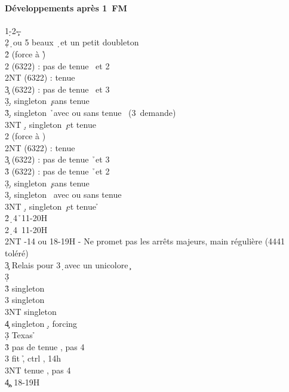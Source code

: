\documentclass[a4paper]{article}
\begin{document}
\paragraph{Développements après 1\pdfc\ FM}

\begin{bidtable}
1\d-2\c--\\
2\d {}\d\ ou 5 beaux \d\ et un petit doubleton\+\\
2\h \> (force à \h )\+\\
2\s {} (6322) : pas de tenue \s\ et 2\c \\
2NT  (6322) : tenue \s \\
3\c {} (6322) : pas de tenue \s\ et 3\c \\
3\d {}\d , singleton \c\ sans tenue \s \\
3\h {}\d , singleton \h\ avec ou sans tenue \s\ (3\s\ demande)\\
3NT \d , singleton \c\ et tenue \s \-\\
2\s \> (force à \s )\+\\
2NT  (6322) : tenue \h \\
3\c {} (6322) : pas de tenue \h\ et 3\c \\
3\h {} (6322) : pas de tenue \h\ et 2\c \\
3\d {}\d , singleton \c\ sans tenue \h \\
3\s {}\d , singleton \s\ avec ou sans tenue \h \\
3NT \d , singleton \c\ et tenue \h \-\-\\
2\h {}\d\ 4\h\ 11-20H\\
2\s {}\d\ 4\s\ 11-20H\\
2NT -14 ou 18-19H - Ne promet pas les arrêts majeurs, main régulière (4441 toléré)\+\\
3\c \> Relais pour 3\d\ avec un unicolore \c \+\\
3\d\+\\
3\h \> singleton \s \\
3\s \> singleton \h \\
3NT \> singleton \d \\
4\c \> singleton \d , forcing\-\-\\
3\d \> Texas \h \+\\
3\h \> pas de tenue \s , pas 4\h \\
3\s \> fit \h , ctrl \s , 14h\\
3NT \> tenue \s , pas 4\h \\
4\c {}\c , 18-19H\\

\end{bidtable}
\end{document}
